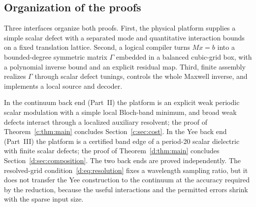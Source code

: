 \subsection{Organization of the proofs}

Three interfaces organize both proofs. First, the physical platform supplies a simple scalar defect with a separated mode and quantitative interaction bounds on a fixed translation lattice. Second, a logical compiler turns $Mx=b$ into a bounded-degree symmetric matrix $\Gamma$ embedded in a balanced cubic-grid box, with a polynomial inverse bound and an explicit residual map. Third, finite assembly realizes $\Gamma$ through scalar defect tunings, controls the whole Maxwell inverse, and implements a local source and decoder.

In the continuum back end (Part~II) the platform is an explicit weak
periodic scalar modulation with a simple local Bloch-band minimum, and
broad weak defects interact through a localized auxiliary resolvent; the
proof of Theorem~\ref{c:thm:main} concludes Section~\ref{c:sec:cost}.
In the Yee back end (Part~III) the platform is a certified band edge of
a period-20 scalar dielectric with finite scalar defects; the proof of
Theorem~\ref{d:thm:main} concludes Section~\ref{d:sec:composition}.
The two back ends are proved independently. The resolved-grid
condition~\eqref{d:eq:resolution} fixes a wavelength sampling ratio, but
it does not transfer the Yee construction to the continuum at the
accuracy required by the reduction, because the useful interactions and
the permitted errors shrink with the sparse input size.
